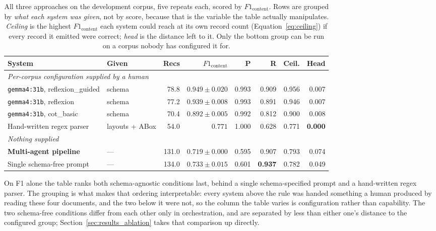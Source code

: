 \documentclass[11pt]{article}
\begin{document}
\begin{table}[H]
\centering
\caption{All three approaches on the development corpus, five repeats each,
scored by $F1_{\text{content}}$. Rows are grouped by \emph{what each system was
given}, not by score, because that is the variable the table actually
manipulates. \emph{Ceiling} is the highest $F1_{\text{content}}$ each system
could reach at its own record count (Equation~\ref{eq:ceiling}) if every record
it emitted were correct; \emph{head} is the distance left to it. Only the
bottom group can be run on a corpus nobody has configured it for.}
\label{tab:grid_contrast}
\small
\begin{tabular}{llrrrrrr}
\toprule
\textbf{System} & \textbf{Given} & \textbf{Recs} & \textbf{$F1_{\text{content}}$} &
\textbf{P} & \textbf{R} & \textbf{Ceil.} & \textbf{Head} \\
\midrule
\multicolumn{8}{l}{\emph{Per-corpus configuration supplied by a human}} \\
\texttt{gemma4:31b}, reflexion\_guided & schema & 78.8 & $0.949 \pm 0.020$ & 0.993 & 0.909 & 0.956 & 0.007 \\
\texttt{gemma4:31b}, reflexion         & schema & 77.2 & $0.939 \pm 0.008$ & 0.993 & 0.891 & 0.946 & 0.007 \\
\texttt{gemma4:31b}, cot\_basic        & schema & 70.4 & $0.892 \pm 0.005$ & 0.992 & 0.812 & 0.900 & 0.008 \\
Hand-written regex parser              & layouts + ABox & 54.0 & $0.771$ & 1.000 & 0.628 & 0.771 & \textbf{0.000} \\
\midrule
\multicolumn{8}{l}{\emph{Nothing supplied}} \\
\textbf{Multi-agent pipeline}          & --- & 131.0 & $\mathbf{0.719 \pm 0.000}$ & 0.595 & 0.907 & 0.793 & 0.074 \\
Single schema-free prompt              & --- & 134.0 & $0.733 \pm 0.015$ & 0.601 & \textbf{0.937} & 0.782 & 0.049 \\
\bottomrule
\end{tabular}
\end{table}

On F1 alone the table ranks both schema-agnostic conditions last, behind a
single schema-specified prompt and a hand-written regex parser. The grouping is
what makes that ordering interpretable: every system above the rule was handed
something a human produced by reading these four documents, and the two below it
were not, so the column the table varies is configuration rather than capability.
The two schema-free conditions differ from each other only in orchestration, and
are separated by less than either one's distance to the configured group;
Section~\ref{sec:results_ablation} takes that comparison up directly.
\end{document}
